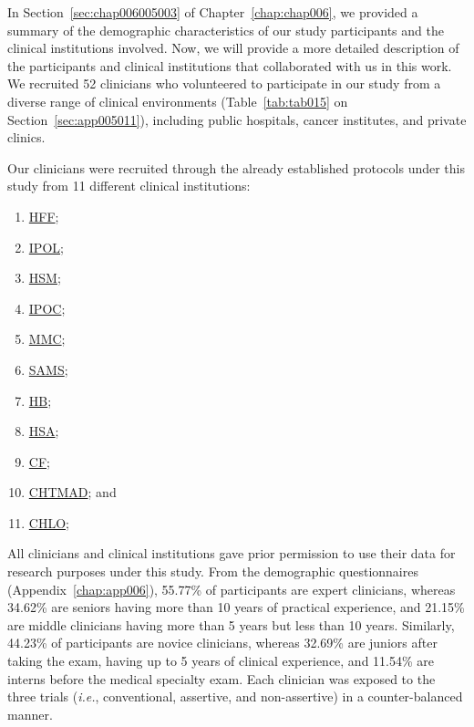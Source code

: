 In Section~\ref{sec:chap006005003} of Chapter~\ref{chap:chap006}, we provided a summary of the demographic characteristics of our study participants and the clinical institutions involved.
Now, we will provide a more detailed description of the participants and clinical institutions that collaborated with us in this work.
We recruited 52 clinicians who volunteered to participate in our study from a diverse range of clinical environments (Table~\ref{tab:tab015} on Section~\ref{sec:app005011}), including public hospitals, cancer institutes, and private clinics.

\vspace{0.50mm}

\noindent
Our clinicians were recruited through the already established protocols under this study from 11 different clinical institutions:

\vspace{0.05mm}

\begin{enumerate}
\item \href{https://hff.min-saude.pt}{\acf{HFF}};
\item \href{https://www.ipolisboa.min-saude.pt}{\acf{IPOL}};
\item \href{https://www.chln.min-saude.pt}{\acf{HSM}};
\item \href{http://www.ipocoimbra.min-saude.pt}{\acf{IPOC}};
\item \href{http://www.madeiramedicalcenter.pt}{\acf{MMC}};
\item \href{https://www.sams.pt}{\acf{SAMS}};
\item \href{http://www.chbm.min-saude.pt}{\acf{HB}};
\item \href{https://www.chporto.pt}{\acf{HSA}};
\item \href{https://www.fchampalimaud.org/}{\acf{CF}};
\item \href{https://www.chtmad.min-saude.pt/}{\acf{CHTMAD}}; and
\item \href{https://www.chlo.min-saude.pt/}{\acf{CHLO}};
\end{enumerate}

\vspace{0.05mm}

All clinicians and clinical institutions gave prior permission to use their data for research purposes under this study.
From the demographic questionnaires (Appendix~\ref{chap:app006}), 55.77\% of participants are expert clinicians, whereas 34.62\% are seniors having more than 10 years of practical experience, and 21.15\% are middle clinicians having more than 5 years but less than 10 years.
Similarly, 44.23\% of participants are novice clinicians, whereas 32.69\% are juniors after taking the exam, having up to 5 years of clinical experience, and 11.54\% are interns before the medical specialty exam.
Each clinician was exposed to the three trials ({\it i.e.}, conventional, assertive, and non-assertive) in a counter-balanced manner.

